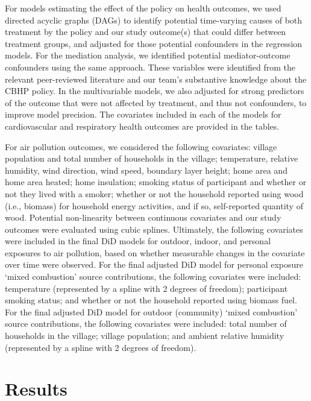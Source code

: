 \documentclass[
  letterpaper,
  DIV=11,
  numbers=noendperiod]{scrartcl}
\begin{document}
For models estimating the effect of the policy on health outcomes, we
used directed acyclic graphs (DAGs) to identify potential time-varying
causes of both treatment by the policy and our study outcome(s) that
could differ between treatment groups, and adjusted for those potential
confounders in the regression models. For the mediation analysis, we
identified potential mediator-outcome confounders using the same
approach. These variables were identified from the relevant
peer-reviewed literature and our team's substantive knowledge about the
CBHP policy. In the multivariable models, we also adjusted for strong
predictors of the outcome that were not affected by treatment, and thus
not confounders, to improve model precision. The covariates included in
each of the models for cardiovascular and respiratory health outcomes
are provided in the tables.

For air pollution outcomes, we considered the following covariates:
village population and total number of households in the village;
temperature, relative humidity, wind direction, wind speed, boundary
layer height; home area and home area heated; home insulation; smoking
status of participant and whether or not they lived with a smoker;
whether or not the household reported using wood (i.e., biomass) for
household energy activities, and if so, self-reported quantity of wood.
Potential non-linearity between continuous covariates and our study
outcomes were evaluated using cubic splines. Ultimately, the following
covariates were included in the final DiD models for outdoor, indoor,
and personal exposures to air pollution, based on whether measurable
changes in the covariate over time were observed. For the final adjusted
DiD model for personal exposure `mixed combustion' source contributions,
the following covariates were included: temperature (represented by a
spline with 2 degrees of freedom); participant smoking status; and
whether or not the household reported using biomass fuel. For the final
adjusted DiD model for outdoor (community) `mixed combustion' source
contributions, the following covariates were included: total number of
households in the village; village population; and ambient relative
humidity (represented by a spline with 2 degrees of freedom).

\hypertarget{results-1}{%
\section{Results}\label{results-1}}
\end{document}
